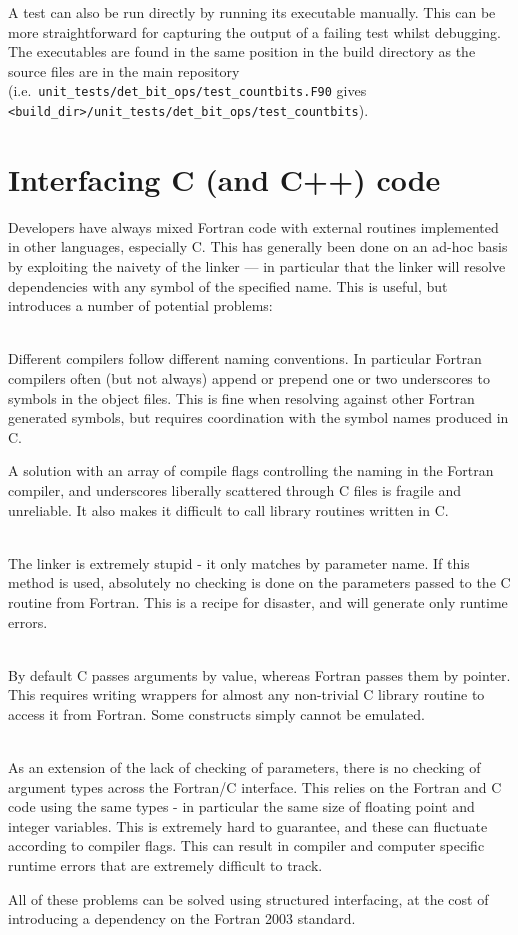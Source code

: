 \documentclass[a4paper,notitlepage]{scrreprt}
\newcommand\headitem[1]{\needspace{1.5\baselineskip}\item[{\boldmath #1 \nopagebreak}] \hfill \\ \nopagebreak}
\let\code\lstinline
\begin{document}
{{{    A test can also be run directly by running its executable manually. This can be more
    straightforward for capturing the output of a failing test whilst debugging. The
    executables are found in the same position in the build directory as the source files
    are in the main repository (i.e.\ \code[breaklines=true]{unit_tests/det_bit_ops/test_countbits.F90}
    gives \code[breaklines=true]{<build_dir>/unit_tests/det_bit_ops/test_countbits}).

\section{Interfacing C (and C++) code}
Developers have always mixed Fortran code with external routines implemented
in other languages, especially C. This has generally been done on an ad-hoc
basis by exploiting the naivety of the linker --- in particular that the linker
will resolve dependencies with any symbol of the specified name. This is
useful, but introduces a number of potential problems:
\begin{description}
	\headitem{Name clashes}
		Different compilers follow different naming conventions. In particular
		Fortran compilers often (but not always) append or prepend one or two
		underscores to symbols in the object files. This is fine when resolving
		against other Fortran generated symbols, but requires coordination with
		the symbol names produced in C.

		A solution with an array of compile flags controlling the naming in the
		Fortran compiler, and underscores liberally scattered through C files
		is fragile and unreliable. It also makes it difficult to call library
		routines written in C.

	\headitem{No checking of parameters}
		The linker is extremely stupid - it only matches by parameter name. If
		this method is used, absolutely no checking is done on the parameters
		passed to the C routine from Fortran. This is a recipe for disaster,
		and will generate only runtime errors.

	\headitem{Calling}
		By default C passes arguments by value, whereas Fortran passes them
		by pointer. This requires writing wrappers for almost any non-trivial
		C library routine to access it from Fortran. Some constructs simply
		cannot be emulated.

	\headitem{Variable types}
		As an extension of the lack of checking of parameters, there is no
		checking of argument types across the Fortran/C interface. This relies
		on the Fortran and C code using the same types - in particular the
		same size of floating point and integer variables. This is extremely
		hard to guarantee, and these can fluctuate according to compiler flags.
		This can result in compiler and computer specific runtime errors that
		are extremely difficult to track.
\end{description}
All of these problems can be solved using structured interfacing, at the cost
of introducing a dependency on the Fortran 2003 standard.

}}}
\end{document}
